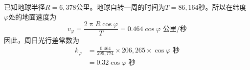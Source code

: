 \documentclass[../outline-of-mechanics.tex]{subfiles}
\begin{document}
已知地球半径$R=6,378$公里。地球自转一周的时间为$T=
  86,164$秒。所以在纬度$\varphi$处的地面速度为
\begin{equation*}
  v_\varphi=\frac{2\uppi R\cos\varphi}{T}=0.464\cos\varphi\text{ 公里/秒}
\end{equation*}
因此，周日光行差常数为
\begin{align*}
  k_\varphi & =\frac{0.464}{299,774}\times 206,265\times\cos\varphi\text{ 秒} \\
            & =0.32\cos\varphi\text{ 秒}
\end{align*}
\end{document}

